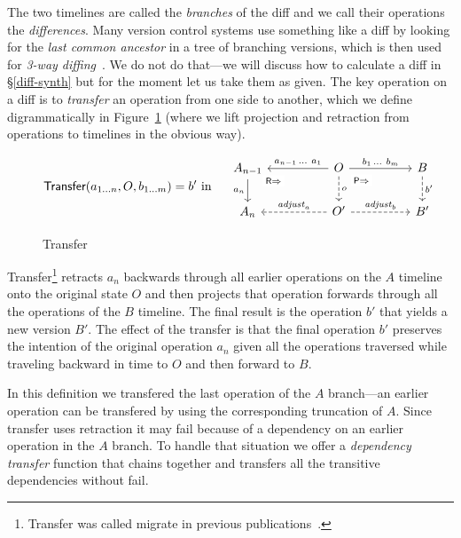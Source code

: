\documentclass[english,submission]{programming}
\theoremstyle{definition}
\begin{document}
The two timelines are called the \textit{branches} of the diff and we call their operations the \textit{differences}. Many version control systems use something like a diff by looking for the \textit{last common ancestor} in a tree of branching versions, which is then used for \textit{3-way diffing}~\cite{diff3}. We do not do that---we will discuss how to calculate a diff in \S\ref{diff-synth} but for the moment let us take them as given. The key operation on a diff is to
\textit{transfer} an operation from one side to another, which we define digrammatically in Figure~\ref{fig:transfer} (where we lift projection and retraction from operations to timelines in the obvious way).
\vspace{-16pt}
\begin{figure}[h]
\[
\textsf{Transfer}(a_{1\ldots n}, O, b_{1\ldots m}) = b' \textrm{ in }\quad
\begin{tikzcd}[column sep = huge]
	A_{n-1} & O & B \\
	A_n & {O'} & {B'}
	\arrow["{a_n}"', from=1-1, to=2-1]
	\arrow["{\textsf{R}\Rightarrow}"{description, pos=0.1}, draw=none, from=1-1, to=2-2]
	\arrow["{a_{n-1}\,\ldots\  a_1}"', from=1-2, to=1-1]
	\arrow["{b_1\,\ldots \  b_m}", from=1-2, to=1-3]
	\arrow["o", dashed, from=1-2, to=2-2]
	\arrow["{\textsf{P}\Rightarrow}"{description, pos=0.2}, draw=none, from=1-2, to=2-3]
	\arrow["{b'}", dashed, from=1-3, to=2-3]
	\arrow["{\mathit{adjust}_a}"', dashed, from=2-2, to=2-1]
	\arrow["{\mathit{adjust}_b}", dashed, from=2-2, to=2-3]
\end{tikzcd}\]
\vspace{-16pt}
\caption{Transfer}
\label{fig:transfer}
\end{figure}

Transfer\footnote{Transfer was called migrate in previous publications~\cite{edwards21, edwards22}.} retracts $a_n$ backwards through all earlier operations on the $A$ timeline onto the original state $O$ and then projects that operation forwards through all the operations of the $B$ timeline. The final result is the operation $b'$ that yields a new version $B'$. The effect of the transfer is that the final operation $b'$ preserves the intention of the original operation $a_n$ given all the operations traversed while traveling backward in time to $O$ and then forward to $B$.

In this definition we transfered the last operation of the $A$ branch---an earlier operation can be transfered by using the corresponding truncation of $A$.
Since transfer uses retraction it may fail because of a dependency on an earlier operation in the $A$ branch. To handle that situation we offer a \textit{dependency transfer} function that chains together and transfers all the transitive dependencies without fail.
\end{document}

